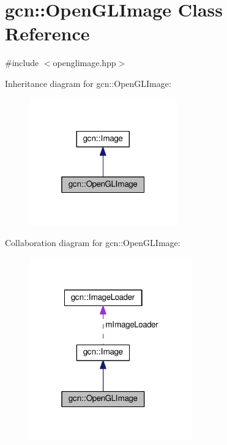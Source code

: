 \hypertarget{classgcn_1_1OpenGLImage}{}\section{gcn\+:\+:Open\+G\+L\+Image Class Reference}
\label{classgcn_1_1OpenGLImage}


{\ttfamily \#include $<$openglimage.\+hpp$>$}



Inheritance diagram for gcn\+:\+:Open\+G\+L\+Image\+:\nopagebreak
\begin{figure}[H]
\begin{center}
\leavevmode
\includegraphics[width=181pt]{classgcn_1_1OpenGLImage__inherit__graph}
\end{center}
\end{figure}


Collaboration diagram for gcn\+:\+:Open\+G\+L\+Image\+:\nopagebreak
\begin{figure}[H]
\begin{center}
\leavevmode
\includegraphics[width=199pt]{classgcn_1_1OpenGLImage__coll__graph}
\end{center}
\end{figure}
